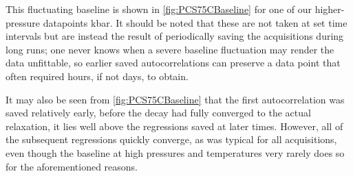 This fluctuating baseline is shown in \fig \ref{fig:PCS75CBaseline} for one of our higher-pressure datapoints kbar. It should be noted that these are not taken at set time intervals but are instead the result of periodically saving the acquisitions during long runs; one never knows when a severe baseline fluctuation may render the data unfittable, so earlier saved autocorrelations can preserve a data point that often required hours, if not days, to obtain.

It may also be seen from \fig \ref{fig:PCS75CBaseline} that the first autocorrelation was saved relatively early, before the decay had fully converged to the actual relaxation\textemdash \ie, it lies well above the regressions saved at later times. However, all of the subsequent regressions quickly converge, as was typical for all acquisitions, even though the baseline at high pressures and temperatures very rarely does so for the aforementioned reasons.


